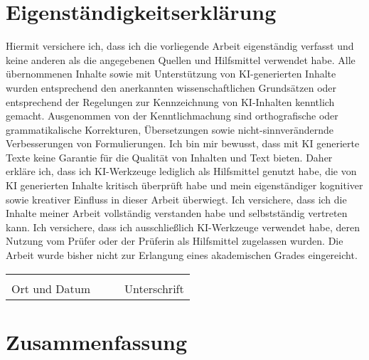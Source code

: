 \begin{appendices}

\chapter{Eigenständigkeitserklärung}
	
\vspace{1cm}
\noindent	
Hiermit versichere ich, dass ich die vorliegende Arbeit eigenständig verfasst und keine anderen als die angegebenen Quellen und Hilfsmittel verwendet habe. Alle übernommenen Inhalte sowie mit Unterstützung von KI-generierten Inhalte wurden entsprechend den anerkannten wissenschaftlichen Grundsätzen oder entsprechend der Regelungen zur Kennzeichnung von KI-Inhalten kenntlich gemacht. Ausgenommen von der Kenntlichmachung sind orthografische oder grammatikalische Korrekturen, Übersetzungen sowie nicht-sinnverändernde Verbesserungen von Formulierungen. Ich bin mir bewusst, dass mit KI generierte Texte keine Garantie für die Qualität von Inhalten und Text bieten. Daher erkläre ich, dass ich KI-Werkzeuge lediglich als Hilfsmittel genutzt habe, die von KI generierten Inhalte kritisch überprüft habe und mein eigenständiger kognitiver sowie kreativer Einfluss in dieser Arbeit überwiegt. Ich versichere, dass ich die Inhalte meiner Arbeit vollständig verstanden habe und selbstständig vertreten kann. Ich versichere, dass ich ausschließlich KI-Werkzeuge verwendet habe, deren Nutzung vom Prüfer oder der Prüferin als Hilfsmittel zugelassen wurden. Die Arbeit wurde bisher nicht zur Erlangung eines akademischen Grades eingereicht. 

\vspace{1.5cm}
	
\noindent\begin{tabularx}{\textwidth}{XXXX}
	&&& \\
	\cline{1-1}\cline{4-4}\footnotesize\centering Ort und Datum		&&& \footnotesize\centering Unterschrift
\end{tabularx}
	
\newpage

\chapter{Zusammenfassung}


\lipsum[1-4]

\end{appendices}
 
\backmatter


